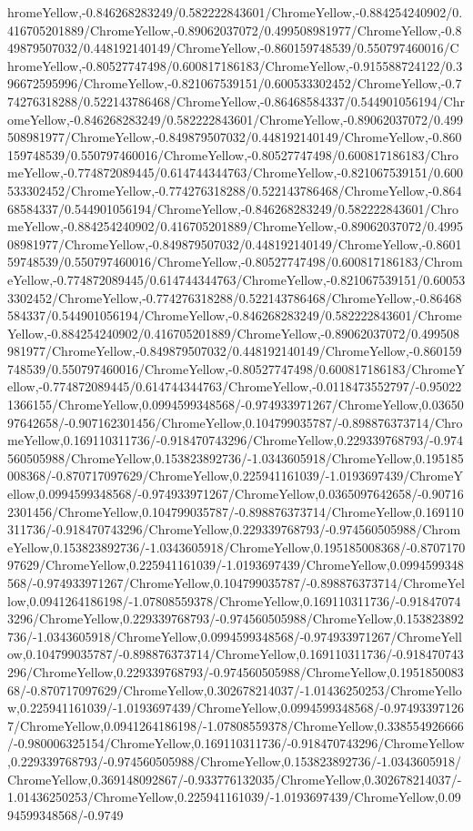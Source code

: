 {\begin{tikzternal}
{hromeYellow,-0.846268283249/0.582222843601/ChromeYellow,-0.884254240902/0.416705201889/ChromeYellow,-0.89062037072/0.499508981977/ChromeYellow,-0.849879507032/0.448192140149/ChromeYellow,-0.860159748539/0.550797460016/ChromeYellow,-0.80527747498/0.600817186183/ChromeYellow,-0.915588724122/0.396672595996/ChromeYellow,-0.821067539151/0.600533302452/ChromeYellow,-0.774276318288/0.522143786468/ChromeYellow,-0.86468584337/0.544901056194/ChromeYellow,-0.846268283249/0.582222843601/ChromeYellow,-0.89062037072/0.499508981977/ChromeYellow,-0.849879507032/0.448192140149/ChromeYellow,-0.860159748539/0.550797460016/ChromeYellow,-0.80527747498/0.600817186183/ChromeYellow,-0.774872089445/0.614744344763/ChromeYellow,-0.821067539151/0.600533302452/ChromeYellow,-0.774276318288/0.522143786468/ChromeYellow,-0.86468584337/0.544901056194/ChromeYellow,-0.846268283249/0.582222843601/ChromeYellow,-0.884254240902/0.416705201889/ChromeYellow,-0.89062037072/0.499508981977/ChromeYellow,-0.849879507032/0.448192140149/ChromeYellow,-0.860159748539/0.550797460016/ChromeYellow,-0.80527747498/0.600817186183/ChromeYellow,-0.774872089445/0.614744344763/ChromeYellow,-0.821067539151/0.600533302452/ChromeYellow,-0.774276318288/0.522143786468/ChromeYellow,-0.86468584337/0.544901056194/ChromeYellow,-0.846268283249/0.582222843601/ChromeYellow,-0.884254240902/0.416705201889/ChromeYellow,-0.89062037072/0.499508981977/ChromeYellow,-0.849879507032/0.448192140149/ChromeYellow,-0.860159748539/0.550797460016/ChromeYellow,-0.80527747498/0.600817186183/ChromeYellow,-0.774872089445/0.614744344763/ChromeYellow,-0.0118473552797/-0.950221366155/ChromeYellow,0.0994599348568/-0.974933971267/ChromeYellow,0.0365097642658/-0.907162301456/ChromeYellow,0.104799035787/-0.898876373714/ChromeYellow,0.169110311736/-0.918470743296/ChromeYellow,0.229339768793/-0.974560505988/ChromeYellow,0.153823892736/-1.0343605918/ChromeYellow,0.195185008368/-0.870717097629/ChromeYellow,0.225941161039/-1.0193697439/ChromeYellow,0.0994599348568/-0.974933971267/ChromeYellow,0.0365097642658/-0.907162301456/ChromeYellow,0.104799035787/-0.898876373714/ChromeYellow,0.169110311736/-0.918470743296/ChromeYellow,0.229339768793/-0.974560505988/ChromeYellow,0.153823892736/-1.0343605918/ChromeYellow,0.195185008368/-0.870717097629/ChromeYellow,0.225941161039/-1.0193697439/ChromeYellow,0.0994599348568/-0.974933971267/ChromeYellow,0.104799035787/-0.898876373714/ChromeYellow,0.0941264186198/-1.07808559378/ChromeYellow,0.169110311736/-0.918470743296/ChromeYellow,0.229339768793/-0.974560505988/ChromeYellow,0.153823892736/-1.0343605918/ChromeYellow,0.0994599348568/-0.974933971267/ChromeYellow,0.104799035787/-0.898876373714/ChromeYellow,0.169110311736/-0.918470743296/ChromeYellow,0.229339768793/-0.974560505988/ChromeYellow,0.195185008368/-0.870717097629/ChromeYellow,0.302678214037/-1.01436250253/ChromeYellow,0.225941161039/-1.0193697439/ChromeYellow,0.0994599348568/-0.974933971267/ChromeYellow,0.0941264186198/-1.07808559378/ChromeYellow,0.338554926666/-0.980006325154/ChromeYellow,0.169110311736/-0.918470743296/ChromeYellow,0.229339768793/-0.974560505988/ChromeYellow,0.153823892736/-1.0343605918/ChromeYellow,0.369148092867/-0.933776132035/ChromeYellow,0.302678214037/-1.01436250253/ChromeYellow,0.225941161039/-1.0193697439/ChromeYellow,0.0994599348568/-0.9749}
\end{tikzternal}}
